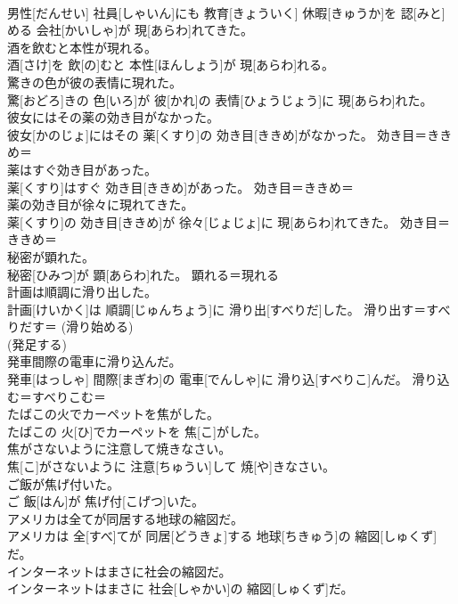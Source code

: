 \documentclass[8pt]{extreport}
\begin{document}
\begin{CJK}{UTF8}{min}
{\\	男性[だんせい] 社員[しゃいん]にも 教育[きょういく] 休暇[きゅうか]を 認[みと]める 会社[かいしゃ]が 現[あらわ]れてきた。	
\\	酒を飲むと本性が現れる。	
\\	酒[さけ]を 飲[の]むと 本性[ほんしょう]が 現[あらわ]れる。	
\\	驚きの色が彼の表情に現れた。	
\\	驚[おどろ]きの 色[いろ]が 彼[かれ]の 表情[ひょうじょう]に 現[あらわ]れた。	
\\	彼女にはその薬の効き目がなかった。	
\\	彼女[かのじょ]にはその 薬[くすり]の 効き目[ききめ]がなかった。	効き目＝ききめ＝ 
\\	薬はすぐ効き目があった。	
\\	薬[くすり]はすぐ 効き目[ききめ]があった。	効き目＝ききめ＝ 
\\	薬の効き目が徐々に現れてきた。	
\\	薬[くすり]の 効き目[ききめ]が 徐々[じょじょ]に 現[あらわ]れてきた。	効き目＝ききめ＝ 
\\	秘密が顕れた。	
\\	秘密[ひみつ]が 顕[あらわ]れた。	顕れる＝現れる
\\	計画は順調に滑り出した。	
\\	計画[けいかく]は 順調[じゅんちょう]に 滑り出[すべりだ]した。	滑り出す＝すべりだす＝ (滑り始める) 
\\	(発足する) 
\\	発車間際の電車に滑り込んだ。	
\\	発車[はっしゃ] 間際[まぎわ]の 電車[でんしゃ]に 滑り込[すべりこ]んだ。	滑り込む＝すべりこむ＝ 
\\	たばこの火でカーペットを焦がした。	
\\	たばこの 火[ひ]でカーペットを 焦[こ]がした。	
\\	焦がさないように注意して焼きなさい。	
\\	焦[こ]がさないように 注意[ちゅうい]して 焼[や]きなさい。	
\\	ご飯が焦げ付いた。	
\\	ご 飯[はん]が 焦げ付[こげつ]いた。	
\\	アメリカは全てが同居する地球の縮図だ。	
\\	アメリカは 全[すべ]てが 同居[どうきょ]する 地球[ちきゅう]の 縮図[しゅくず]だ。	
\\	インターネットはまさに社会の縮図だ。	
\\	インターネットはまさに 社会[しゃかい]の 縮図[しゅくず]だ。	
}
\end{CJK}
\end{document}
